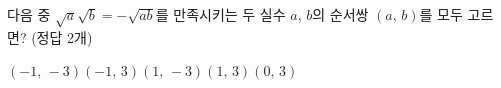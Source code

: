 다음 중 $\sqrt{a}\sqrt{b}=-\sqrt{ab}$를 만족시키는 두 실수 $a$, $b$의 순서쌍 $(a,\,b)$를 모두 고르면? (정답 2개)
\begin{choices32}{$(-1,\,-3)$}{$(-1,\,3)$}{$(1,\,-3)$}{$(1,\,3)$}{$(0,\,3)$}\end{choices32}
